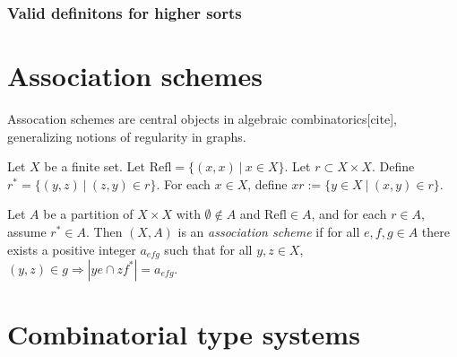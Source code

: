 \subsubsection{Valid definitons for higher sorts}

\section{Association schemes}

Assocation schemes are central objects in algebraic combinatorics[cite], generalizing notions of regularity in graphs.

\begin{definition}
    Let $X$ be a finite set. Let $\mathrm{Refl} = \{(x,x)\ |\ x\in X\}$. Let $r \subset X\times X$. Define $r^* = \{(y,z)\ |\ (z,y)\in r\}$. For each $x\in X$, define $xr := \{y\in X\ |\ (x,y)\in r \}$.

    Let $A$ be a partition of $X\times X$ with $\emptyset\notin A$ and $\mathrm{Refl}\in A$, and for each $r \in A$, assume $r^* \in A$. Then $(X,A)$ is an \emph{association scheme} if for all $e,f,g\in A$ there exists a positive integer $a_{efg}$ such that for all $y,z\in X$, $(y,z) \in g \Rightarrow | ye \cap zf^{*} | = a_{efg}$.
\end{definition}

\section{Combinatorial type systems}

